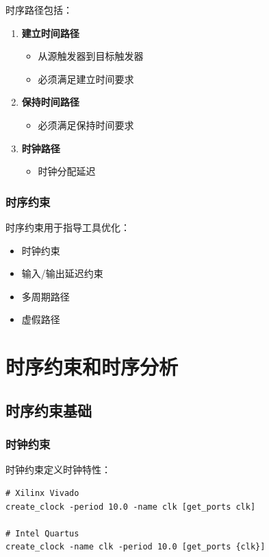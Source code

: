 时序路径包括：
\begin{enumerate}
  \item \textbf{建立时间路径}
    \begin{itemize}
      \item 从源触发器到目标触发器
      \item 必须满足建立时间要求
    \end{itemize}

  \item \textbf{保持时间路径}
    \begin{itemize}
      \item 必须满足保持时间要求
    \end{itemize}

  \item \textbf{时钟路径}
    \begin{itemize}
      \item 时钟分配延迟
    \end{itemize}
\end{enumerate}

\subsubsection{时序约束}

时序约束用于指导工具优化：
\begin{itemize}
  \item 时钟约束
  \item 输入/输出延迟约束
  \item 多周期路径
  \item 虚假路径
\end{itemize}

\section{时序约束和时序分析}

\subsection{时序约束基础}

\subsubsection{时钟约束}

时钟约束定义时钟特性：

\begin{verbatim}
# Xilinx Vivado
create_clock -period 10.0 -name clk [get_ports clk]

# Intel Quartus
create_clock -name clk -period 10.0 [get_ports {clk}]
\end{verbatim}


